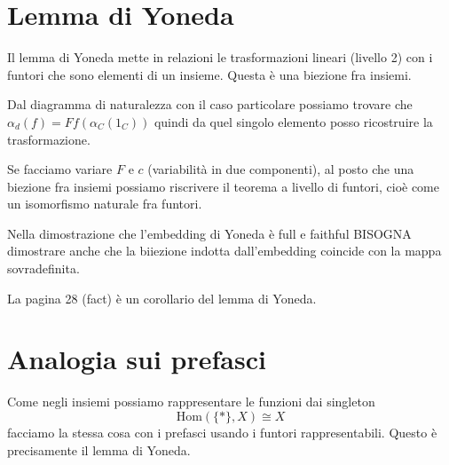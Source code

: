 \documentclass[a4paper]{article}
\begin{document}

\pagebreak

\section{Lemma di Yoneda}

Il lemma di Yoneda mette in relazioni le trasformazioni lineari
(livello 2) con i funtori che sono elementi di un insieme. Questa è una biezione fra insiemi.

Dal diagramma di naturalezza con il caso particolare possiamo trovare che
\(\alpha_d(f) = Ff(\alpha_C(1_C))\) quindi da quel singolo elemento posso ricostruire
la trasformazione.

Se facciamo variare \(F\) e \(c\) (variabilità in due componenti),
al posto che una biezione fra insiemi possiamo riscrivere il teorema
a livello di funtori, cioè come un isomorfismo naturale fra funtori.


Nella dimostrazione che l'embedding di Yoneda
è full e faithful BISOGNA dimostrare anche che la biiezione indotta dall'embedding
coincide con la mappa sovradefinita.

La pagina 28 (fact) è un corollario del lemma di Yoneda.

\section{Analogia sui prefasci}

Come negli insiemi possiamo rappresentare le funzioni dai singleton
\[
    \text{Hom}(\{\ast\}, X) \cong X
\]
facciamo la stessa cosa con i prefasci usando i funtori rappresentabili.
Questo è precisamente il lemma di Yoneda.
\end{document}
